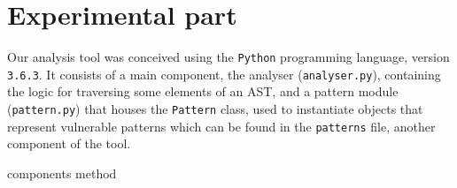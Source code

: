 \section*{Experimental part}
\label{sec:experimental}

Our analysis tool was conceived using the \verb|Python| programming language,
version \verb|3.6.3|. It consists of a main component, the analyser
(\verb|analyser.py|), containing the logic for traversing some elements of an
AST, and a pattern module (\verb|pattern.py|) that houses the \verb|Pattern|
class, used to instantiate objects that represent vulnerable patterns which can
be found in the \verb|patterns| file, another component of the tool.

{components}
{method}
